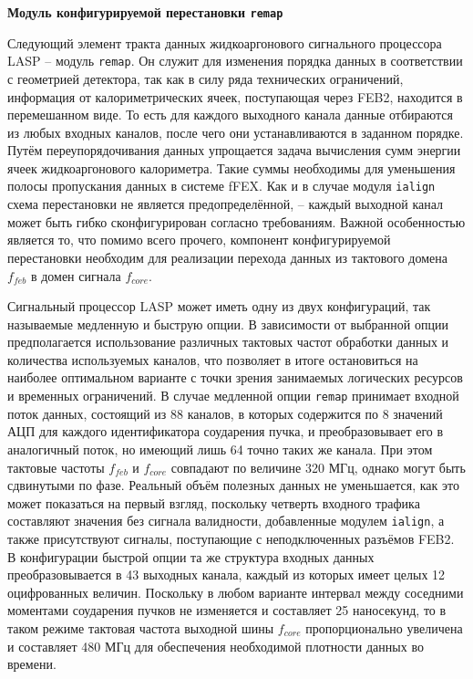 \textbf{Модуль конфигурируемой перестановки \texttt{remap}}\par
Следующий элемент тракта данных жидкоаргонового сигнального процессора LASP -- модуль \texttt{remap}. Он служит для изменения порядка данных в соответствии с геометрией детектора, так как в силу ряда технических ограничений, информация от калориметрических ячеек, поступающая через FEB2, находится в перемешанном виде. То есть для каждого выходного канала данные отбираются из любых входных каналов, после чего они устанавливаются в заданном порядке. Путём переупорядочивания данных упрощается задача вычисления сумм энергии ячеек жидкоаргонового калориметра. Такие суммы необходимы для уменьшения полосы пропускания данных в системе fFEX. Как и в случае модуля \texttt{ialign} схема перестановки не является предопределённой, -- каждый выходной канал может быть гибко сконфигурирован согласно требованиям. Важной особенностью является то, что помимо всего прочего, компонент конфигурируемой перестановки необходим для реализации перехода данных из тактового домена $f_{feb}$ в домен сигнала $f_{core}$.\par
Сигнальный процессор LASP может иметь одну из двух конфигураций, так называемые медленную и быструю опции. В зависимости от выбранной опции предполагается использование различных тактовых частот обработки данных и количества используемых каналов, что позволяет в итоге остановиться на наиболее оптимальном варианте с точки зрения занимаемых логических ресурсов и временных ограничений.  В случае медленной опции \texttt{remap} принимает входной поток данных, состоящий из 88 каналов, в которых содержится по 8 значений АЦП для каждого идентификатора соударения пучка, и преобразовывает его в аналогичный поток, но имеющий лишь 64 точно таких же канала. При этом тактовые частоты $f_{feb}$ и $f_{core}$ совпадают по величине 320 МГц, однако могут быть сдвинутыми по фазе. Реальный объём полезных данных не уменьшается, как это может показаться на первый взгляд, поскольку четверть входного трафика составляют значения без сигнала валидности, добавленные модулем \texttt{ialign}, а также присутствуют сигналы, поступающие с неподключенных разъёмов FEB2. В конфигурации быстрой опции та же структура входных данных преобразовывается в 43 выходных канала, каждый из которых имеет целых 12 оцифрованных величин. Поскольку в любом варианте интервал между соседними моментами соударения пучков не изменяется и составляет 25 наносекунд, то в таком режиме тактовая частота выходной шины $f_{core}$ пропорционально увеличена и составляет 480 МГц для обеспечения необходимой плотности данных во времени.\par
